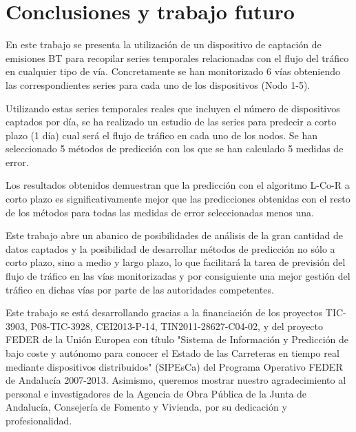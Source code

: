 \documentclass[runningheads]{llncs}
\begin{document}

\section{Conclusiones y trabajo futuro}
\label{sec:conclusions}

En este trabajo se presenta la utilización de un dispositivo de captación de emisiones BT para
recopilar series temporales relacionadas con el flujo del tráfico en cualquier tipo de vía.
Concretamente se han monitorizado 6 vías obteniendo las correspondientes series para cada uno de
los  dispositivos (Nodo 1-5). 

Utilizando estas series temporales reales que incluyen el número de dispositivos captados por día,
se ha realizado un estudio de las series para predecir a corto plazo (1 día) cual será el flujo de
tráfico en cada uno de los nodos. Se han seleccionado 5 métodos de predicción con los que se han
calculado 5 medidas de error. 

Los resultados obtenidos demuestran que la predicción con el algoritmo L-Co-R a corto plazo es
significativamente mejor que las predicciones obtenidas con el resto de los métodos para todas las
medidas de error seleccionadas menos una. 

Este trabajo abre un abanico de posibilidades de análisis de la gran cantidad de datos captados y
la posibilidad de desarrollar métodos de predicción no sólo a corto plazo, sino a medio y largo
plazo, lo que facilitará la tarea de previsión del flujo de tráfico en las vías monitorizadas y por
consiguiente una mejor gestión del tráfico en dichas vías por parte de las autoridades competentes.

Este trabajo se está desarrollando gracias a la financiación de los proyectos TIC-3903, P08-TIC-3928,
CEI2013-P-14, TIN2011-28627-C04-02, y del proyecto FEDER de la Unión Europea con título "Sistema de Información y Predicción de
bajo coste y autónomo para conocer el Estado de las Carreteras en tiempo real mediante dispositivos distribuidos" (SIPEsCa) del
Programa Operativo FEDER de Andalucía 2007-2013. Asimismo, queremos mostrar nuestro agradecimiento al personal e investigadores de
la Agencia de Obra Pública de la Junta de Andalucía, Consejería de Fomento y Vivienda, por su dedicación y
profesionalidad. 
\begin{figure} 
\begin{center} 
\end{center}\end{figure}
\end{document}
